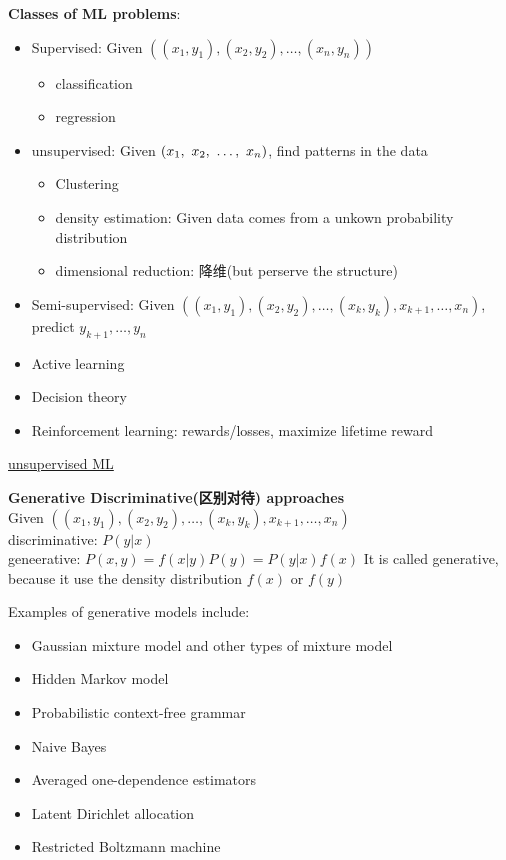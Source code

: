 \documentclass{article}
\begin{document}
\textbf{Classes of ML problems}:
\begin{itemize}
\item Supervised: Given $((x_1, y_1), (x_2, y_2), \ldots, (x_n, y_n))$
	\begin{itemize}
	\item classification
	\item regression
	\end{itemize}
\item unsupervised: Given $(x_1,~x_2,~\ldots,~x_n)$, find patterns in the data
	\begin{itemize}
	\item Clustering
	\item density estimation: Given data comes from a unkown probability distribution
	\item dimensional reduction: 降维(but perserve the structure)
	\end{itemize}
\item Semi-supervised: Given $((x_1, y_1), (x_2, y_2), \ldots, (x_k, y_k), x_{k+1}, \ldots, x_n)$, predict $y_{k+1}, \ldots, y_n$
\item Active learning
\item Decision theory
\item Reinforcement learning: rewards/losses, maximize lifetime reward
\end{itemize}
\href{http://i.imgbox.com/sVuBzaqV.png}{unsupervised ML}

\textbf{Generative Discriminative(区别对待) approaches}\\
Given $((x_1, y_1), (x_2, y_2), \ldots, (x_k, y_k), x_{k+1}, \ldots, x_n)$\\
discriminative: $P(y|x)$\\
geneerative: $P(x,y) = f(x|y)P(y) = P(y|x)f(x)$
It is called generative, because it use the density distribution $f(x)$ or $f(y)$

Examples of generative models include:
\begin{itemize}
\item Gaussian mixture model and other types of mixture model
\item Hidden Markov model
\item Probabilistic context-free grammar
\item Naive Bayes
\item Averaged one-dependence estimators
\item Latent Dirichlet allocation
\item Restricted Boltzmann machine
\end{itemize}
\end{document}

